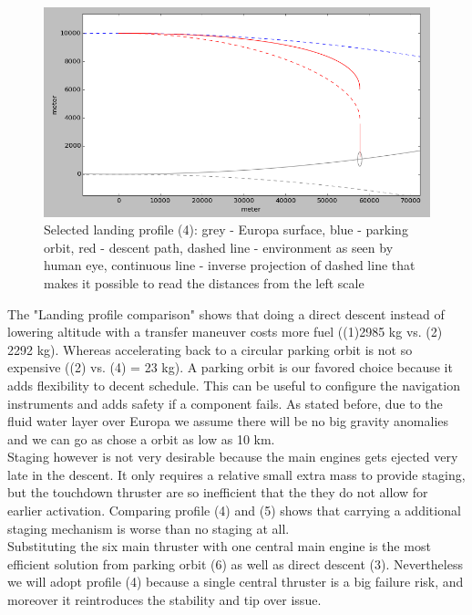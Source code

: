 \begin{figure}[htb]
	\centering
	\includegraphics[width=\textwidth]{Lander/aaronlandingprofile}
	\caption{Selected landing profile (4): grey - Europa surface, blue - parking orbit, red - descent path, dashed line - environment as seen by human eye, continuous line - inverse projection of dashed line that makes it possible to read the distances from the left scale\label{fig:alandingprofile}}
\end{figure}


The "Landing profile comparison" shows that doing a direct descent instead of lowering altitude with a transfer maneuver costs more fuel ((1)2985 kg vs. (2) 2292 kg). Whereas accelerating back to a circular parking orbit is not so expensive ((2) vs. (4) = 23 kg). A parking orbit is our favored choice because it adds flexibility to decent schedule. This can be useful to configure the navigation instruments and adds safety if a component fails. As stated before, due to the fluid water layer over Europa we assume there will be no big gravity anomalies and we can go as chose a orbit as low as 10 km.\\ 
Staging however is not very desirable because the main engines gets ejected very late in the descent. It only requires a relative small extra mass to provide staging, but the touchdown thruster are so inefficient that the they do not allow for earlier activation. Comparing profile (4) and (5) shows that carrying a additional staging mechanism is worse than no staging at all.\\
Substituting the six main thruster with one central main engine is the most efficient solution from parking orbit (6) as well as direct descent (3). Nevertheless we will adopt profile (4) because a single central thruster is a big failure risk, and moreover it reintroduces the stability and tip over issue.


